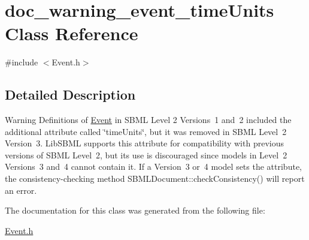 \hypertarget{classdoc__warning__event__time_units}{}\section{doc\+\_\+warning\+\_\+event\+\_\+time\+Units Class Reference}
\label{classdoc__warning__event__time_units}


{\ttfamily \#include $<$Event.\+h$>$}



\subsection{Detailed Description}
\begin{DoxyWarning}{Warning}
Definitions of \hyperlink{class_event}{Event} in S\+B\+ML Level 2 Versions~1 and~2 included the additional attribute called \char`\"{}time\+Units\char`\"{}, but it was removed in S\+B\+ML Level~2 Version~3. Lib\+S\+B\+ML supports this attribute for compatibility with previous versions of S\+B\+ML Level~2, but its use is discouraged since models in Level~2 Versions~3 and~4 cannot contain it. If a Version~3 or~4 model sets the attribute, the consistency-\/checking method S\+B\+M\+L\+Document\+::check\+Consistency() will report an error. 
\end{DoxyWarning}


The documentation for this class was generated from the following file\+:\begin{DoxyCompactItemize}
\item 
\hyperlink{_event_8h}{Event.\+h}\end{DoxyCompactItemize}
